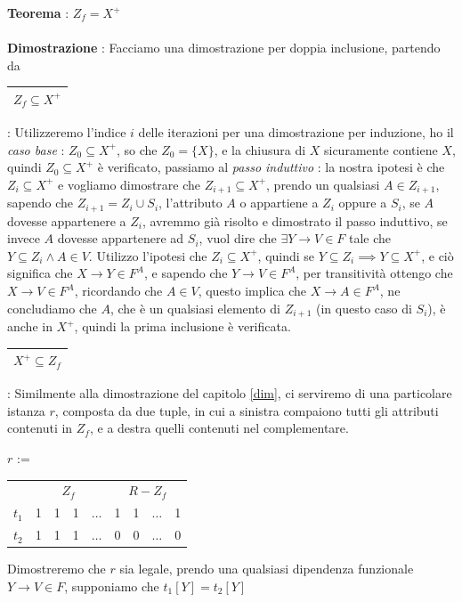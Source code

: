 \documentclass[12pt, letterpaper]{article}
\newcommand{\acc}{\\\hphantom{}\\}
\begin{document}
\textbf{Teorema} : \(Z_f=X^+\)\acc 
\textbf{Dimostrazione} : Facciamo una dimostrazione per doppia inclusione, partendo da 
\begin{tabular}{|c|}\hline \(Z_f\subseteq X^+\) \\ \hline\end{tabular} : Utilizzeremo l'indice \(i\) delle iterazioni 
per una dimostrazione per induzione, ho il \textit{caso base }: \(Z_0\subseteq X^+\), so che \(Z_0=\{X\}\), e la chiusura 
di \(X\) sicuramente contiene \(X\), quindi \(Z_0\subseteq X^+\) è verificato, passiamo al 
\textit{passo induttivo} : la nostra ipotesi è che \(Z_i\subseteq X^+\) e vogliamo dimostrare che \(Z_{i+1}\subseteq X^+\), 
prendo un qualsiasi \(A\in Z_{i+1}\), sapendo che \(Z_{i+1}=Z_i\cup S_i\), l'attributo \(A\) o appartiene a \(Z_i\)
oppure a \(S_i\), se \(A\) dovesse appartenere a \(Z_i\), avremmo già risolto e dimostrato il passo induttivo, se invece \(A\) 
dovesse appartenere ad \(S_i\), vuol dire che \(\exists Y\rightarrow V\in F\) tale che \(Y\subseteq Z_i\land A\in V\). 
Utilizzo l'ipotesi che \(Z_i\subseteq X^+\), quindi se \(Y\subseteq Z_i\implies Y\subseteq X^+\), e ciò significa 
 che \(X\rightarrow Y\in F^A\), e sapendo che \(Y\rightarrow V\in F^A\), per transitività ottengo che \(X\rightarrow V\in F^A\), 
 ricordando che \(A\in V\), questo implica che \(X\rightarrow A \in F^A\), ne concludiamo che \(A\), che è un qualsiasi 
 elemento di \(Z_{i+1}\) (in questo caso di \(S_i\)), è anche in \( X^+\), quindi la prima inclusione è verificata.\\
 \begin{tabular}{|c|}\hline \(X^+\subseteq Z_f\) \\ \hline\end{tabular} : Similmente alla dimostrazione del capitolo \ref{dim}, 
 ci serviremo di una particolare istanza \(r\), composta da due tuple, in cui a sinistra compaiono tutti gli attributi contenuti in 
 \(Z_f\), e a destra quelli contenuti nel complementare. \begin{center}
    \(r\) := \begin{tabular}{c|cccc|cccc|}
        \cline{2-9}
           & \multicolumn{4}{c|}{\(Z_f\)}                                                      & \multicolumn{4}{c|}{\(R-Z_f\)}                                                    \\ \cline{2-9} 
        \(t_1\) & \multicolumn{1}{c|}{1} & \multicolumn{1}{c|}{1} & \multicolumn{1}{c|}{1} & \(\dots\) & \multicolumn{1}{c|}{1} & \multicolumn{1}{c|}{1} & \multicolumn{1}{c|}{\(\dots\)} & 1 \\ \cline{2-9} 
        \(t_2\) & \multicolumn{1}{c|}{1} & \multicolumn{1}{c|}{1} & \multicolumn{1}{c|}{1} & \(\dots\) & \multicolumn{1}{c|}{0} & \multicolumn{1}{c|}{0} & \multicolumn{1}{c|}{\(\dots\)} & 0 \\ \cline{2-9} 
        \end{tabular}
 \end{center}
Dimostreremo che \(r\) sia legale, prendo una qualsiasi dipendenza funzionale \(Y\rightarrow V\in F\), supponiamo che 
\(t_1[Y]=t_2[Y]\)
\end{document}
